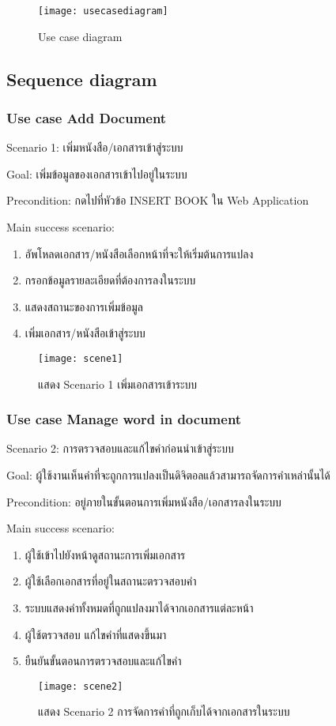 \begin{figure}[H]
    \centering
    \texttt{[image: usecasediagram]}
    \caption{Use case diagram}\label{fig:usecasediagram}
\end{figure}

\subsection{Sequence diagram}

\subsubsection{Use case Add Document}

Scenario 1: เพิ่มหนังสือ/เอกสารเข้าสู่ระบบ

Goal: เพิ่มข้อมูลของเอกสารเข้าไปอยู่ในระบบ

Precondition: กดไปที่หัวข้อ INSERT BOOK ใน Web Application 

Main success scenario:

\begin{enumerate}
    \item อัพโหลดเอกสาร/หนังสือเลือกหน้าที่จะให้เริ่มต้นการแปลง
    \item กรอกข้อมูลรายละเอียดที่ต้องการลงในระบบ
    \item แสดงสถานะของการเพิ่มข้อมูล
    \item เพิ่มเอกสาร/หนังสือเข้าสู่ระบบ
\end{enumerate}

\begin{figure}[H]
    \centering
    \texttt{[image: scene1]}
    \caption{แสดง Scenario 1 เพิ่มเอกสารเข้าระบบ}\label{fig:scene1}
\end{figure}

\subsubsection{Use case Manage word in document}

Scenario 2: การตรวจสอบและแก้ไขคำก่อนนำเข้าสู่ระบบ

Goal: ผู้ใช้งานเห็นคำที่จะถูกการแปลงเป็นดิจิตอลแล้วสามารถจัดการคำเหล่านั้นได้

Precondition: อยู่ภายในขั้นตอนการเพิ่มหนังสือ/เอกสารลงในระบบ

Main success scenario:

\begin{enumerate}
    \item ผู้ใช้เข้าไปยังหน้าดูสถานะการเพิ่มเอกสาร
    \item ผู้ใช้เลือกเอกสารที่อยู่ในสถานะตรวจสอบคำ
    \item ระบบแสดงคำทั้งหมดที่ถูกแปลงมาได้จากเอกสารแต่ละหน้า
    \item ผู้ใช้ตรวจสอบ แก้ไขคำที่แสดงขึ้นมา
    \item ยืนยันขั้นตอนการตรวจสอบและแก้ไขคำ
\end{enumerate}
\begin{figure}[H]
    \centering
    \texttt{[image: scene2]}
    \caption{แสดง Scenario 2 การจัดการคำที่ถูกเก็บได้จากเอกสารในระบบ}\label{fig:scene2}
\end{figure}

